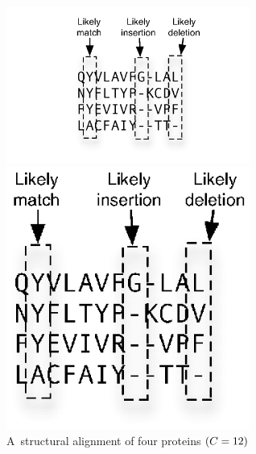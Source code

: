 \documentclass[]{jfp1}
\newcommand\alignwidth{\ensuremath C} %
\newcommand\figlabel[1]{\label{fig:#1}}
\begin{document}
\begin{figure}
\ifpdfmadness
\centerline{\includegraphics[width=8cm]{alignment.pdf}} 
\else
\centerline{\includegraphics[width=8cm]{alignment.eps}} 
\fi

\caption{A~structural alignment of four proteins $(\alignwidth = 12)$}
\figlabel{alignment} 
\end{figure}
\end{document}
